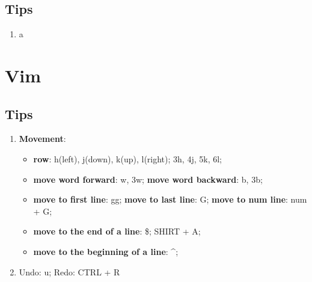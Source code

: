 \documentclass[11pt,twoside,a4paper]{article}
\begin{document}
\subsection{Tips} %
\begin{enumerate}
  \item a
\end{enumerate}
\newpage


\section{Vim} %
\subsection{Tips} %
\begin{enumerate}
  \item \textbf{Movement}:
    \begin{itemize}
      \item \textbf{row}: h(left), j(down), k(up), l(right); 3h, 4j, 5k, 6l;
      \item \textbf{move word forward}: w, 3w; \textbf{move word backward}: b, 3b;
      \item \textbf{move to first line}: gg; \textbf{move to last line}: G; \textbf{move to num line}: num + G;
      \item \textbf{move to the end of a line}: \$; SHIRT + A;
      \item \textbf{move to the beginning of a line}: \^{};
    \end{itemize}
  \item Undo: u; Redo: CTRL + R
\end{enumerate}
\end{document}
